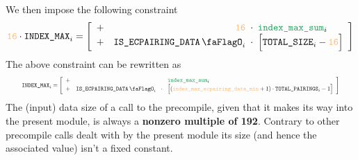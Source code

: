 We then impose the following constraint
\[
	\llarge \cdot \indexMax_{i}
	=
	\left[ \begin{array}{crcl}
			+ & \llarge              & \!\!\!\cdot\!\!\! & \locIndexMaxSum_{i}                        \\
			+ & \isEcpairingData_{i} & \!\!\!\cdot\!\!\! & \Big[ \ecdataTotalSize_{i} - \llarge \Big] \\
		\end{array} \right]
\]
The above constraint can be rewritten as
	\[
		\resizebox{.95\linewidth}{!}{$
		\indexMax_{i}
		=
		\left[ \begin{array}{crcl}
				+ &                      &                   & \locIndexMaxSum_{i}                                                      \\
				+ & \isEcpairingData_{i} & \!\!\!\cdot\!\!\! & \Big[ (\indexMaxEcPairingDataMin + 1) \cdot \totalPairings_{i} - 1 \Big] \\
			\end{array} \right]
		$}
	\]
\saNote{} The (input) data size of a call to the \instEcpairing{} precompile, given that it makes its way into the present module, is always a \textbf{nonzero multiple of 192}. Contrary to other precompile calls dealt with by the present module its size (and hence the associated \indexMax{} value) isn't a fixed constant.
